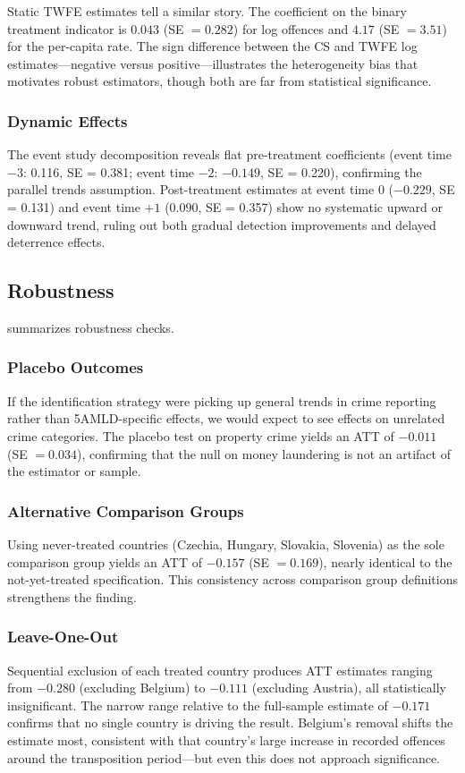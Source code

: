 \documentclass[12pt]{article}
\begin{document}
Static TWFE estimates tell a similar story. The coefficient on the binary treatment indicator is $0.043$ (SE $= 0.282$) for log offences and $4.17$ (SE $= 3.51$) for the per-capita rate. The sign difference between the CS and TWFE log estimates---negative versus positive---illustrates the heterogeneity bias that motivates robust estimators, though both are far from statistical significance.



\subsubsection*{Dynamic Effects}
The event study decomposition reveals flat pre-treatment coefficients (event time $-3$: 0.116, SE = 0.381; event time $-2$: $-0.149$, SE = 0.220), confirming the parallel trends assumption. Post-treatment estimates at event time 0 ($-0.229$, SE = 0.131) and event time $+1$ ($0.090$, SE = 0.357) show no systematic upward or downward trend, ruling out both gradual detection improvements and delayed deterrence effects.

\subsection{Robustness}

 summarizes robustness checks.

\subsubsection*{Placebo Outcomes}
If the identification strategy were picking up general trends in crime reporting rather than 5AMLD-specific effects, we would expect to see effects on unrelated crime categories. The placebo test on property crime yields an ATT of $-0.011$ (SE $= 0.034$), confirming that the null on money laundering is not an artifact of the estimator or sample.

\subsubsection*{Alternative Comparison Groups}
Using never-treated countries (Czechia, Hungary, Slovakia, Slovenia) as the sole comparison group yields an ATT of $-0.157$ (SE $= 0.169$), nearly identical to the not-yet-treated specification. This consistency across comparison group definitions strengthens the finding.

\subsubsection*{Leave-One-Out}
Sequential exclusion of each treated country produces ATT estimates ranging from $-0.280$ (excluding Belgium) to $-0.111$ (excluding Austria), all statistically insignificant. The narrow range relative to the full-sample estimate of $-0.171$ confirms that no single country is driving the result. Belgium's removal shifts the estimate most, consistent with that country's large increase in recorded offences around the transposition period---but even this does not approach significance.
\end{document}
